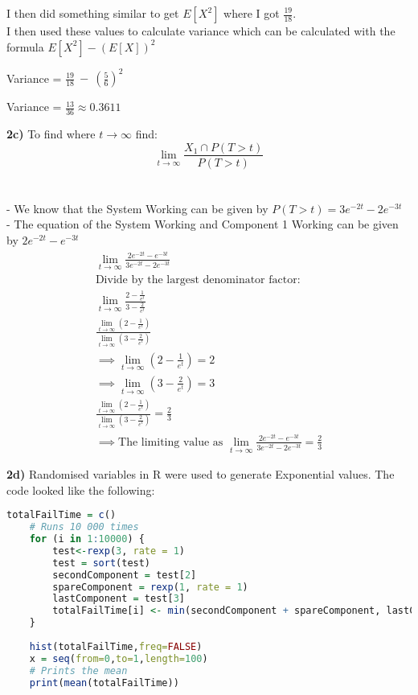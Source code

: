 \documentclass[oneside, a4paper]{article}
\begin{document}
I then did something similar to get $E[X^2]$ where I got $\frac{19}{18}$. \\
I then used these values to calculate variance which can be calculated with the formula $E[X^2] - (E[X])^2$

Variance = $\frac{19}{18}\:-\:\left(\frac{5}{6}\right)^2$

Variance = $\frac{13}{36} \approx 0.3611$

\textbf{2c)} To find where $t \to \infty$ find: 
$$\lim_{t \to \infty} \frac{X_1 \cap P(T>t)}{P(T>t)}$$ \\ \\
- We know that the System Working can be given by $P(T>t) = 3e^{-2t} -2e^{-3t}$ \\
- The equation of the System Working and Component 1 Working can be given by $2e^{-2t} - e^{-3t}$ \\

\begin{equation}
    \begin{split}
        \lim_{t \to \infty} \frac{2e^{-2t} - e^{-3t}}{3e^{-2t} -2e^{-3t}} \\
        \text{Divide by the largest denominator factor:}\\
        \lim_{t \to \infty} \frac{2-\frac{1}{e^t}}{3-\frac{2}{e^t}} \\
        \frac{\lim _{t\to \infty }\left(2-\frac{1}{e^t}\right)}{\lim _{t\to \infty }\left(3-\frac{2}{e^t}\right)} \\ 
        \implies \lim _{t\to \infty }\left(2-\frac{1}{e^t}\right)=2 \\
        \implies \lim _{t\to \infty }\left(3-\frac{2}{e^t}\right)=3 \\ 
        \frac{\lim _{t\to \infty }\left(2-\frac{1}{e^t}\right)}{\lim _{t\to \infty }\left(3-\frac{2}{e^t}\right)} = \frac{2}{3} \\ 
        \implies \text{The limiting value as } \lim_{t \to \infty} \frac{2e^{-2t} - e^{-3t}}{3e^{-2t} -2e^{-3t}} = \frac{2}{3}
    \end{split}
\end{equation}

\textbf{2d)} Randomised variables in R were used to generate Exponential values. The code looked like the following: 

\begin{lstlisting}[language=R]
    totalFailTime = c()
    # Runs 10 000 times
    for (i in 1:10000) {
        test<-rexp(3, rate = 1)
        test = sort(test)
        secondComponent = test[2]
        spareComponent = rexp(1, rate = 1)
        lastComponent = test[3]
        totalFailTime[i] <- min(secondComponent + spareComponent, lastComponent)
    }
    
    hist(totalFailTime,freq=FALSE)
    x = seq(from=0,to=1,length=100)
    # Prints the mean
    print(mean(totalFailTime))
\end{lstlisting}
\end{document}

